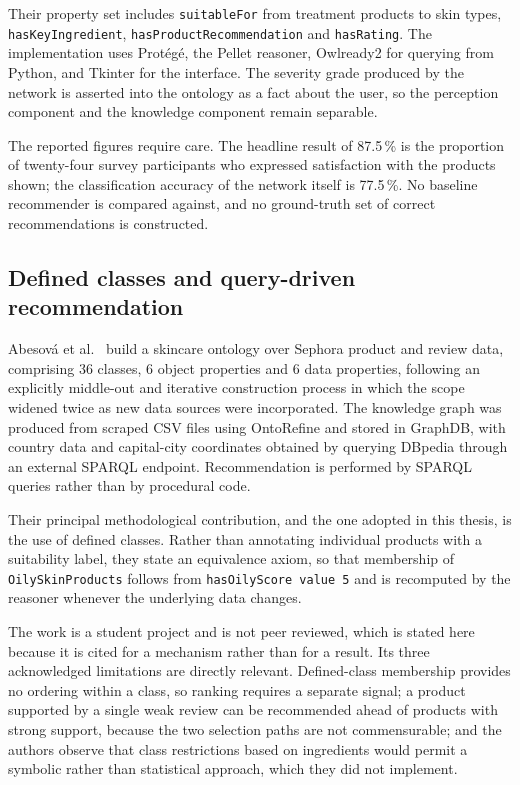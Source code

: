 Their property set includes \texttt{suitableFor} from treatment products to
skin types, \texttt{hasKeyIngredient}, \texttt{hasProductRecommendation} and
\texttt{hasRating}. The implementation uses Prot\'eg\'e, the Pellet reasoner,
Owlready2 for querying from Python, and Tkinter for the interface. The severity
grade produced by the network is asserted into the ontology as a fact about the
user, so the perception component and the knowledge component remain separable.

The reported figures require care. The headline result of 87.5\,\% is the
proportion of twenty-four survey participants who expressed satisfaction with
the products shown; the classification accuracy of the network itself is
77.5\,\%. No baseline recommender is compared against, and no ground-truth set
of correct recommendations is constructed.

\subsection{Defined classes and query-driven recommendation}
\label{ssec:rw-abesova}

Abesov\'a et al.~\cite{abesova2023} build a skincare ontology over Sephora
product and review data, comprising 36 classes, 6 object properties and 6 data
properties, following an explicitly middle-out and iterative construction
process in which the scope widened twice as new data sources were incorporated.
The knowledge graph was produced from scraped CSV files using OntoRefine and
stored in GraphDB, with country data and capital-city coordinates obtained by
querying DBpedia through an external SPARQL endpoint. Recommendation is
performed by SPARQL queries rather than by procedural code.

Their principal methodological contribution, and the one adopted in this
thesis, is the use of defined classes. Rather than annotating individual
products with a suitability label, they state an equivalence axiom, so that
membership of \texttt{OilySkinProducts} follows from
\texttt{hasOilyScore\ value\ 5} and is recomputed by the reasoner whenever the
underlying data changes.

The work is a student project and is not peer reviewed, which is stated here
because it is cited for a mechanism rather than for a result. Its three
acknowledged limitations are directly relevant. Defined-class membership
provides no ordering within a class, so ranking requires a separate signal; a
product supported by a single weak review can be recommended ahead of products
with strong support, because the two selection paths are not commensurable; and
the authors observe that class restrictions based on ingredients would permit a
symbolic rather than statistical approach, which they did not implement.

